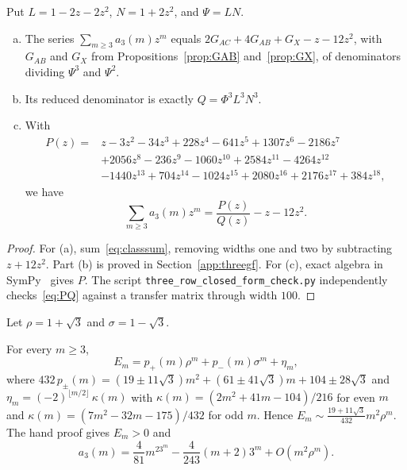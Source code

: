 Put $L=1-2z-2z^2$, $N=1+2z^2$, and $\Psi=LN$.

\begin{theorem}\label{thm:threegf}
\leavevmode
\begin{enumerate}[(a)]
\item The series $\sum_{m\ge3}a_3(m)z^m$ equals $2G_{AC}+4G_{AB}+G_X-z-12z^2$, with
$G_{AB}$ and $G_X$ from Propositions~\ref{prop:GAB} and~\ref{prop:GX}, of denominators
dividing $\Psi^3$ and $\Psi^2$.
\item Its reduced denominator is exactly $Q=\Phi^3L^3N^3$.
\item With
\begin{align*}
P(z)={}&z-3z^2-34z^3+228z^4-641z^5+1307z^6-2186z^7\\
&+2056z^8-236z^9-1060z^{10}+2584z^{11}-4264z^{12}\\
&-1440z^{13}+704z^{14}-1024z^{15}+2080z^{16}+2176z^{17}+384z^{18},
\end{align*}
we have
\begin{equation}\label{eq:PQ}
\sum_{m\ge3}a_3(m)z^m=\frac{P(z)}{Q(z)}-z-12z^2.
\end{equation}
\end{enumerate}
\end{theorem}

\begin{proof}
For (a), sum~\eqref{eq:classsum}, removing widths one and two by
subtracting $z+12z^2$. Part (b) is proved in Section~\ref{app:threegf}.
For (c), exact algebra in SymPy~\cite{sympy2017} gives $P$.
The script \nolinkurl{three_row_closed_form_check.py} independently
checks~\eqref{eq:PQ} against a transfer matrix through width $100$.
\end{proof}

Let $\rho=1+\sqrt3$ and $\sigma=1-\sqrt3$.

\begin{theorem}\label{thm:threeclosed}
For every $m\ge3$,
\begin{equation}\label{eq:Eclosed}
E_m=p_+(m)\rho^m+p_-(m)\sigma^m+\eta_m,
\end{equation}
where $432\,p_\pm(m)=(19\pm11\sqrt3)m^2+(61\pm41\sqrt3)m+104\pm28\sqrt3$ and $\eta_m=(-2)^{\lfloor m/2\rfloor}\,\kappa(m)$ with $\kappa(m)=(2m^2+41m-104)/216$ for even $m$ and
$\kappa(m)=(7m^2-32m-175)/432$ for odd $m$. Hence $E_m\sim\frac{19+11\sqrt3}{432}m^2\rho^m$. The hand proof gives $E_m>0$ and
\begin{equation}\label{eq:asymp1}
a_3(m)=\frac4{81}m^23^m-\frac4{243}(m+2)3^m+O(m^2\rho^m).
\end{equation}
\end{theorem}

